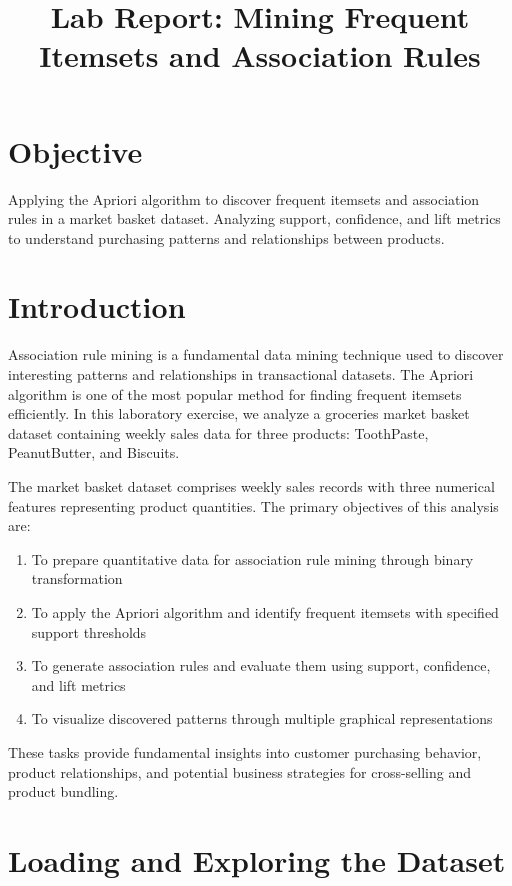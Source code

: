 \documentclass[12pt,a4paper]{article}
\title{\textbf{Lab Report: Mining Frequent Itemsets and Association Rules}}
\author{}
\date{}
\begin{document}
\maketitle

\section{Objective}
Applying the Apriori algorithm to discover frequent itemsets and association rules in a market basket dataset. Analyzing support, confidence, and lift metrics to understand purchasing patterns and relationships between products.

\section{Introduction}

Association rule mining is a fundamental data mining technique used to discover interesting patterns and relationships in transactional datasets. The Apriori algorithm is one of the most popular method for finding frequent itemsets efficiently. In this laboratory exercise, we analyze a groceries market basket dataset containing weekly sales data for three products: ToothPaste, PeanutButter, and Biscuits.

The market basket dataset comprises weekly sales records with three numerical features representing product quantities. The primary objectives of this analysis are:

\begin{enumerate}
    \item To prepare quantitative data for association rule mining through binary transformation
    \item To apply the Apriori algorithm and identify frequent itemsets with specified support thresholds
    \item To generate association rules and evaluate them using support, confidence, and lift metrics
    \item To visualize discovered patterns through multiple graphical representations
\end{enumerate}

These tasks provide fundamental insights into customer purchasing behavior, product relationships, and potential business strategies for cross-selling and product bundling.



\section{Loading and Exploring the Dataset}
\end{document}

